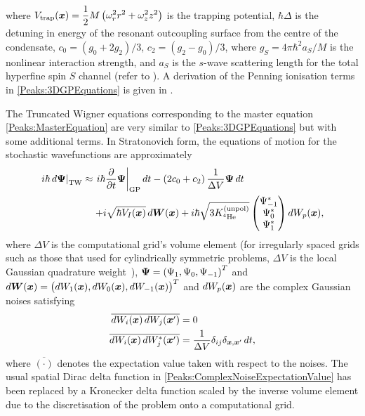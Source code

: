 where $\displaystyle V_\text{trap}(\bm{x}) = \frac{1}{2} M \left(\omega_r^2 r^2 + \omega_z^2 z^2 \right)$ is the trapping potential, $\hbar \Delta$ is the detuning in energy of the resonant outcoupling surface from the centre of the condensate, $c_0 = (g_0 + 2 g_2)/3$, $c_2 = (g_2 - g_0)/3$, where $g_S = 4 \pi \hbar^2 a_S/M$ is the nonlinear interaction strength, and $a_S$ is the $s$-wave scattering length for the total hyperfine spin $S$ channel (refer to ). A derivation of the Penning ionisation terms in \eqref{Peaks:3DGPEquations} is given in .

The Truncated Wigner equations corresponding to the master equation \eqref{Peaks:MasterEquation} are very similar to \eqref{Peaks:3DGPEquations} but with some additional terms. In Stratonovich form, the equations of motion for the stochastic wavefunctions are approximately
\begin{align}
    \label{Peaks:3DTWEquations}
    \begin{split}
        \left. i \hbar \,d\vect{\Psi}\right|_\text{TW} &\approx \left. i \hbar \frac{\partial }{\partial t}\vect{\Psi}\right|_\text{GP} dt - \left(2 c_0 + c_2 \right)\frac{1}{\Delta V}\vect{\Psi}\, dt\\
        &\relphantom{\approx} + i\sqrt{ \hbar V_I(\vect{x})} \,d\vect{W}(\vect{x}) + i \hbar\sqrt{3 \Kunpol}
        \begin{pmatrix}
            \Psi_{-1}^*\\
            \Psi_0^*\\
            \Psi_1^*
        \end{pmatrix} dW_p(\vect{x}),
    \end{split}
\end{align}
where $\Delta V$ is the computational grid's volume element (for irregularly spaced grids such as those that used for cylindrically symmetric problems, $\Delta V$ is the local Gaussian quadrature weight~\citep{Ronen:2006}), $\bm{\Psi} = \left(\Psi_1, \Psi_0, \Psi_{-1} \right)^T$ and $d \bm{W}(\bm{x}) = \big(dW_1(\bm{x}), dW_0(\bm{x}), dW_{-1}(\bm{x})\big)^T$ and $dW_p(\bm{x})$ are the complex Gaussian noises satisfying
\begin{align}
    \overline{dW_i(\vect{x})\, dW_j(\vect{x}')} &= 0 \\
    \overline{dW_i(\vect{x})\, dW_j^*(\vect{x}')} &= \frac{1}{\Delta V}\delta_{ij}\delta_{\vect{x},\vect{x}'}\,dt, \label{Peaks:ComplexNoiseExpectationValue}
\end{align}
where $\overline{(\cdot)}$ denotes the expectation value taken with respect to the noises. The usual spatial Dirac delta function in \eqref{Peaks:ComplexNoiseExpectationValue} has been replaced by a Kronecker delta function scaled by the inverse volume element due to the discretisation of the problem onto a computational grid.

